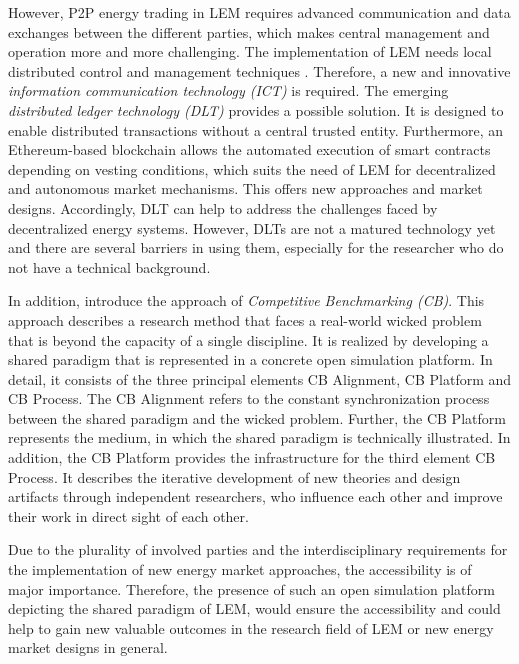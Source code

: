 However, P2P energy trading in LEM requires advanced communication and data exchanges between the different parties, 
which makes central management and operation more and more challenging. The implementation of LEM needs local 
distributed control and management techniques . 
Therefore, a new and innovative \textit{information communication technology (ICT)} is required.  
The emerging \textit{distributed ledger technology (DLT)} provides a possible solution. 
It is designed to enable distributed transactions without a central trusted entity. 
Furthermore, an Ethereum-based blockchain allows the automated execution of smart contracts depending 
on vesting conditions, which suits the need of LEM for decentralized and autonomous market mechanisms. 
This offers new approaches and market designs. Accordingly, DLT can help to address the challenges 
faced by decentralized energy systems. However, DLTs are not a matured technology yet and 
there are several barriers in using them, especially for the researcher who do not have a technical background. 

In addition,  introduce the approach of \textit{Competitive Benchmarking (CB)}. 
This approach describes a research method that faces a real-world wicked problem that is beyond the capacity of a single discipline. 
It is realized by developing a shared paradigm that is represented in a concrete open simulation platform. 
In detail, it consists of the three principal elements CB Alignment, CB Platform and CB Process. 
The CB Alignment refers to the constant synchronization process between the shared paradigm and the wicked problem. 
Further, the CB Platform represents the medium, in which the shared paradigm is technically illustrated. 
In addition, the CB Platform provides the infrastructure for the third element CB Process. 
It describes the iterative development of new theories and design artifacts through independent researchers, 
who influence each other and improve their work in direct sight of each other. 

Due to the plurality of involved parties and the interdisciplinary requirements for the 
implementation of new energy market approaches, the accessibility is of major importance.
Therefore, the presence of such an open simulation platform depicting the shared paradigm of LEM, 
would ensure the accessibility and could help to gain new valuable outcomes in the research field 
of LEM or new energy market designs in general. 

